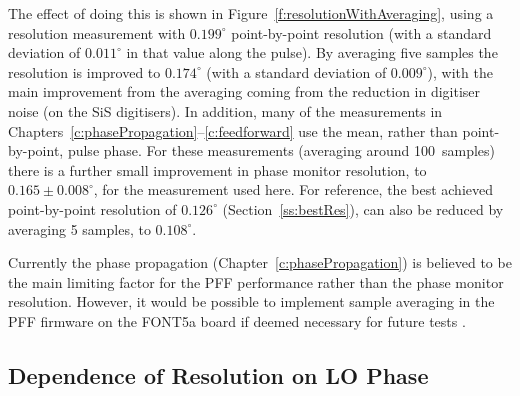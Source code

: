 The effect of doing this is shown in Figure~\ref{f:resolutionWithAveraging}, using a resolution measurement with \(0.199^\circ\) point-by-point resolution (with a standard deviation of \(0.011^\circ\) in that value along the pulse). By averaging five samples the resolution is improved to \(0.174^\circ\) (with a standard deviation of \(0.009^\circ\)), with the main improvement from the averaging coming from the reduction in digitiser noise (on the SiS digitisers). In addition, many of the measurements in Chapters~\ref{c:phasePropagation}--\ref{c:feedforward} use the mean, rather than point-by-point, pulse phase. For these measurements (averaging around 100~samples) there is a further small improvement in phase monitor resolution, to \(0.165\pm0.008^\circ\), for the measurement used here.  For reference, the best achieved point-by-point resolution of \(0.126^\circ\) (Section~\ref{ss:bestRes}), can also be reduced by averaging 5 samples, to \(0.108^\circ\). 

Currently the phase propagation (Chapter~\ref{c:phasePropagation}) is believed to be the main limiting factor for the PFF performance rather than the phase monitor resolution. However, it would be possible to implement sample averaging in the PFF firmware on the FONT5a board if deemed necessary for future tests \cite{glennPriv}. 




\subsection{Dependence of Resolution on LO Phase}
\label{ss:resVsShifter}

